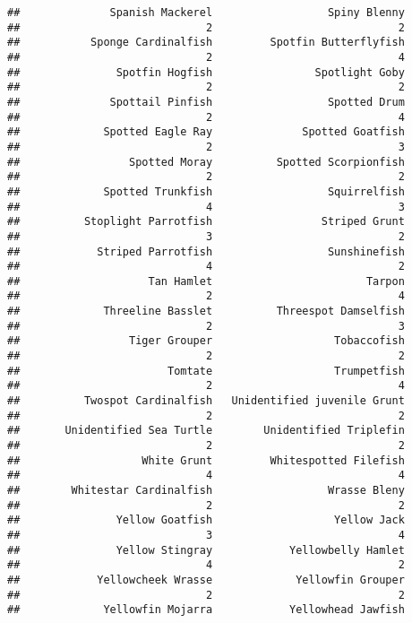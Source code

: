 \documentclass[
]{article}
\begin{document}
\begin{verbatim}
##              Spanish Mackerel                  Spiny Blenny 
##                             2                             2 
##           Sponge Cardinalfish         Spotfin Butterflyfish 
##                             2                             4 
##               Spotfin Hogfish                Spotlight Goby 
##                             2                             2 
##              Spottail Pinfish                  Spotted Drum 
##                             2                             4 
##             Spotted Eagle Ray              Spotted Goatfish 
##                             2                             3 
##                 Spotted Moray          Spotted Scorpionfish 
##                             2                             2 
##             Spotted Trunkfish                  Squirrelfish 
##                             4                             3 
##          Stoplight Parrotfish                 Striped Grunt 
##                             3                             2 
##            Striped Parrotfish                  Sunshinefish 
##                             4                             2 
##                    Tan Hamlet                        Tarpon 
##                             2                             4 
##             Threeline Basslet          Threespot Damselfish 
##                             2                             3 
##                 Tiger Grouper                   Tobaccofish 
##                             2                             2 
##                       Tomtate                   Trumpetfish 
##                             2                             4 
##          Twospot Cardinalfish   Unidentified juvenile Grunt 
##                             2                             2 
##       Unidentified Sea Turtle        Unidentified Triplefin 
##                             2                             2 
##                   White Grunt         Whitespotted Filefish 
##                             4                             4 
##        Whitestar Cardinalfish                  Wrasse Bleny 
##                             2                             2 
##               Yellow Goatfish                   Yellow Jack 
##                             3                             4 
##               Yellow Stingray            Yellowbelly Hamlet 
##                             4                             2 
##            Yellowcheek Wrasse             Yellowfin Grouper 
##                             2                             2 
##             Yellowfin Mojarra            Yellowhead Jawfish 

\end{verbatim}
\end{document}
